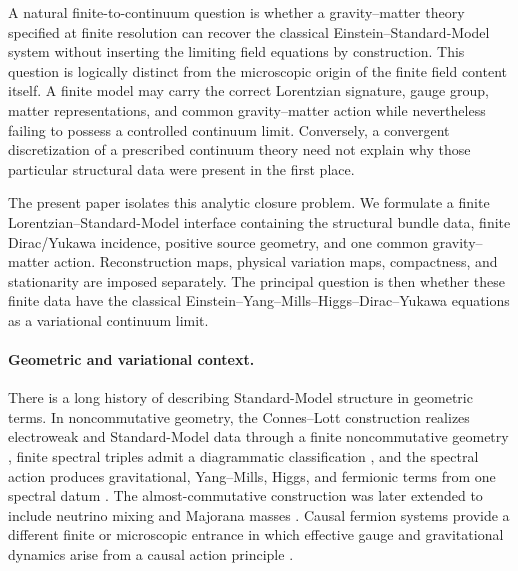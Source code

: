 \documentclass[11pt]{article}
\numberwithin{equation}{section}
\theoremstyle{definition}
\theoremstyle{remark}
\begin{document}
A natural finite-to-continuum question is whether a gravity--matter theory
specified at finite resolution can recover the classical
Einstein--Standard-Model system without inserting the limiting field equations
by construction.  This question is logically distinct from the microscopic
origin of the finite field content itself.  A finite model may carry the
correct Lorentzian signature, gauge group, matter representations, and common
gravity--matter action while nevertheless failing to possess a controlled
continuum limit.  Conversely, a convergent discretization of a prescribed
continuum theory need not explain why those particular structural data were
present in the first place.

The present paper isolates this analytic closure problem.  We formulate a
finite Lorentzian--Standard-Model interface containing the structural bundle
data, finite Dirac/Yukawa incidence, positive source geometry, and one common
gravity--matter action.  Reconstruction maps, physical variation maps,
compactness, and stationarity are imposed separately.  The principal question
is then whether these finite data have the classical
Einstein--Yang--Mills--Higgs--Dirac--Yukawa equations as a variational
continuum limit.

\paragraph{Geometric and variational context.}

There is a long history of describing Standard-Model structure in geometric
terms.  In noncommutative geometry, the Connes--Lott construction realizes
electroweak and Standard-Model data through a finite noncommutative geometry
\cite{ConnesLott1991}, finite spectral triples admit a diagrammatic
classification \cite{Krajewski1998}, and the spectral action produces
gravitational, Yang--Mills, Higgs, and fermionic terms from one spectral datum
\cite{ChamseddineConnes1997}.  The almost-commutative construction was later
extended to include neutrino mixing and Majorana masses
\cite{ChamseddineConnesMarcolli2007}.  Causal fermion systems provide a
different finite or microscopic entrance in which effective gauge and
gravitational dynamics arise from a causal action principle
\cite{Finster2016}.
\end{document}
